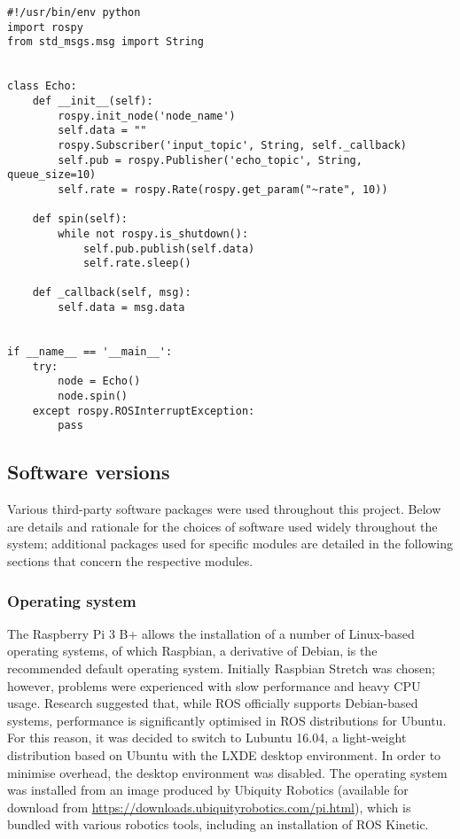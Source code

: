 \begin{lstlisting}[caption={Example ROS node}, label={lst:ros_node}]
#!/usr/bin/env python
import rospy
from std_msgs.msg import String


class Echo:
    def __init__(self):
        rospy.init_node('node_name')
        self.data = ""
        rospy.Subscriber('input_topic', String, self._callback)
        self.pub = rospy.Publisher('echo_topic', String, queue_size=10)
        self.rate = rospy.Rate(rospy.get_param("~rate", 10))

    def spin(self):
        while not rospy.is_shutdown():
            self.pub.publish(self.data)
            self.rate.sleep()

    def _callback(self, msg):
        self.data = msg.data


if __name__ == '__main__':
    try:
        node = Echo()
        node.spin()
    except rospy.ROSInterruptException:
        pass
\end{lstlisting}

\subsection{Software versions}
Various third-party software packages were used throughout this project.
Below are details and rationale for the choices of software used
widely throughout the system; additional packages used for specific modules
are detailed in the following sections that concern the respective modules.

\subsubsection{Operating system}
The Raspberry Pi 3 B+ allows the installation of a number of Linux-based
operating systems, of which Raspbian, a derivative of Debian, is the
recommended default operating system. Initially Raspbian Stretch was chosen;
however, problems were experienced with slow performance and heavy CPU usage.
Research suggested that, while ROS officially supports Debian-based
systems, performance is significantly optimised in ROS distributions for
Ubuntu. For this reason, it was decided to switch to Lubuntu 16.04, a light-weight
distribution based on Ubuntu with the LXDE desktop environment.
In order to minimise overhead, the desktop environment was disabled. The
operating system was installed from an image produced by Ubiquity
Robotics (available for download from
\url{https://downloads.ubiquityrobotics.com/pi.html}), which is
bundled with various robotics tools, including an installation of ROS
Kinetic.

